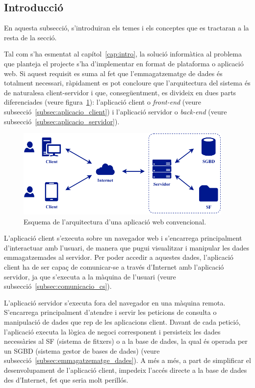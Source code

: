 \documentclass[a4paper,12pt]{ThesisStyle}
\begin{document}
\subsection{Introducció}
\label{subsec:intro_conceptes_tecnics}

En aquesta subsecció, s'introduiran els temes i els conceptes que es tractaran a la resta de la secció.

Tal com s'ha esmentat al capítol~\ref{cap:intro}, la solució informàtica al problema que planteja el projecte s'ha d'implementar en format de plataforma o aplicació web. Si aquest requisit es suma al fet que l'emmagatzematge de dades és totalment necessari, ràpidament es pot concloure que l'arquitectura del sistema és de naturalesa client-servidor i que, consegüentment, es divideix en dues parts diferenciades (veure figura~\ref{img:esquema_web}): l'aplicació client o \textit{front-end} (veure subsecció~\ref{subsec:aplicacio_client}) i l'aplicació servidor o \textit{back-end} (veure subsecció~\ref{subsec:aplicacio_servidor}).

\begin{figure}[H]
  \centering
  \includegraphics[width=0.95\textwidth]{assets/figs/esquemaWeb.pdf}
  \caption{\label{img:esquema_web}Esquema de l'arquitectura d'una aplicació web convencional.}
\end{figure}

L'aplicació client s'executa sobre un navegador web i s'encarrega principalment d'interactuar amb l'usuari, de manera que pugui visualitzar i manipular les dades emmagatzemades al servidor. Per poder accedir a aquestes dades, l'aplicació client ha de ser capaç de comunicar-se a través d'Internet amb l'aplicació servidor, ja que s'executa a la màquina de l'usuari (veure subsecció~\ref{subsec:comunicacio_cs}).

L'aplicació servidor s'executa fora del navegador en una màquina remota. S'encarrega principalment d'atendre i servir les peticions de consulta o manipulació de dades que rep de les aplicacions client. Davant de cada petició, l'aplicació executa la lògica de negoci corresponent i persisteix les dades necessàries al SF (sistema de fitxers) o a la base de dades, la qual és operada per un SGBD (sistema gestor de bases de dades) (veure subsecció~\ref{subsec:emmagatzematge_dades}). A més a més, a part de simplificar el desenvolupament de l'aplicació client, impedeix l'accés directe a la base de dades des d'Internet, fet que seria molt perillós.
\end{document}
